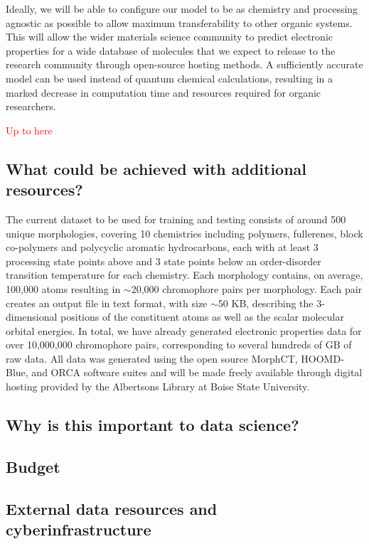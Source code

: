 \documentclass[12pt]{article}
\begin{document}
Ideally, we will be able to configure our model to be as chemistry and processing agnostic as possible to allow maximum transferability to other organic systems.
This will allow the wider materials science community to predict electronic properties for a wide database of molecules that we expect to release to the research community through open-source hosting methods.
A sufficiently accurate model can be used instead of quantum chemical calculations, resulting in a marked decrease in computation time and resources required for organic researchers.


\textcolor{red}{Up to here}


\subsection{What could be achieved with additional resources?}

The current dataset to be used for training and testing consists of around 500 unique morphologies, covering 10 chemistries including polymers, fullerenes, block co-polymers and polycyclic aromatic hydrocarbons, each with at least 3 processing state points above and 3 state points below an order-disorder transition temperature for each chemistry.
Each morphology contains, on average, 100,000 atoms resulting in $\sim$20,000 chromophore pairs per morphology.
Each pair creates an output file in text format, with size $\sim$50 KB, describing the 3-dimensional positions of the constituent atoms as well as the scalar molecular orbital energies.
In total, we have already generated electronic properties data for over 10,000,000 chromophore pairs, corresponding to several hundreds of GB of raw data.
All data was generated using the open source MorphCT\cite{MorphCT,Jones2017}, HOOMD-Blue\cite{Anderson08}, and ORCA\cite{Neese2012b} software suites and will be made freely available through digital hosting provided by the Albertsons Library at Boise State University.



\subsection{Why is this important to data science?}

\subsection{Budget}

\subsection{External data resources and cyberinfrastructure}


\newpage




\end{document}
